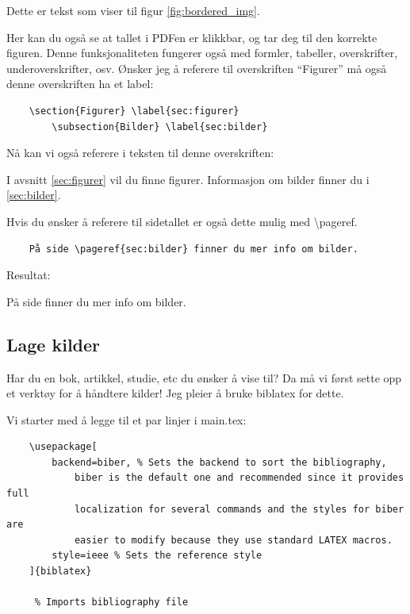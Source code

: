         Dette er tekst som viser til figur \ref{fig:bordered_img}.
        
        Her kan du også se at tallet i PDFen er klikkbar, og tar deg til den korrekte figuren. Denne funksjonaliteten fungerer også med formler, tabeller, overskrifter, underoverskrifter, osv. Ønsker jeg å referere til overskriften ``Figurer'' må også denne overskriften ha et label:
        \begin{verbatim}
    \section{Figurer} \label{sec:figurer}
        \subsection{Bilder} \label{sec:bilder}
        \end{verbatim}
        
        Nå kan vi også referere i teksten til denne overskriften:
        
        I avsnitt \ref{sec:figurer} vil du finne figurer. Informasjon om bilder finner du i \ref{sec:bilder}.
        
        Hvis du ønsker å referere til sidetallet er også dette mulig med \textbackslash pageref.
        \begin{verbatim}
    På side \pageref{sec:bilder} finner du mer info om bilder.
        \end{verbatim}
        Resultat:
        
        På side \pageref{sec:bilder} finner du mer info om bilder.
            
    \subsection{Lage kilder}
        Har du en bok, artikkel, studie, etc du ønsker å vise til? Da må vi først sette opp et verktøy for å håndtere kilder! Jeg pleier å bruke biblatex for dette.
        
        Vi starter med å legge til et par linjer i main.tex:
        \begin{verbatim}
    \usepackage[
        backend=biber, % Sets the backend to sort the bibliography, 
            biber is the default one and recommended since it provides full 
            localization for several commands and the styles for biber are 
            easier to modify because they use standard LATEX macros.
        style=ieee % Sets the reference style
    ]{biblatex}
    
     % Imports bibliography file        
        \end{verbatim}
        
